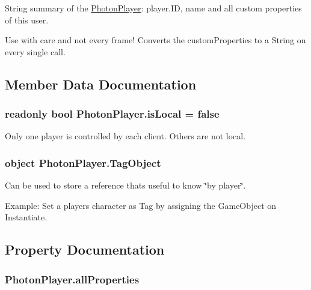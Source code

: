 String summary of the \hyperlink{class_photon_player}{Photon\+Player}\+: player.\+ID, name and all custom properties of this user. 

Use with care and not every frame! Converts the custom\+Properties to a String on every single call. 

\subsection{Member Data Documentation}
\subsubsection[{\texorpdfstring{is\+Local}{isLocal}}]{\setlength{\rightskip}{0pt plus 5cm}readonly bool Photon\+Player.\+is\+Local = false}\hypertarget{class_photon_player_a7d51daf7a538dadae8339e95bf39e692}{}\label{class_photon_player_a7d51daf7a538dadae8339e95bf39e692}


Only one player is controlled by each client. Others are not local.

\subsubsection[{\texorpdfstring{Tag\+Object}{TagObject}}]{\setlength{\rightskip}{0pt plus 5cm}object Photon\+Player.\+Tag\+Object}\hypertarget{class_photon_player_aaf54b32878a605d3e4d47f16ad106aa3}{}\label{class_photon_player_aaf54b32878a605d3e4d47f16ad106aa3}


Can be used to store a reference that\textquotesingle{}s useful to know \char`\"{}by player\char`\"{}. 

Example\+: Set a player\textquotesingle{}s character as Tag by assigning the Game\+Object on Instantiate.

\subsection{Property Documentation}
\subsubsection[{\texorpdfstring{all\+Properties}{allProperties}}]{ Photon\+Player.\+all\+Properties\hspace{0.3cm}{\ttfamily [get]}}\hypertarget{class_photon_player_a82ba921802edc4960d075f1deacfb19d}{}\label{class_photon_player_a82ba921802edc4960d075f1deacfb19d}


